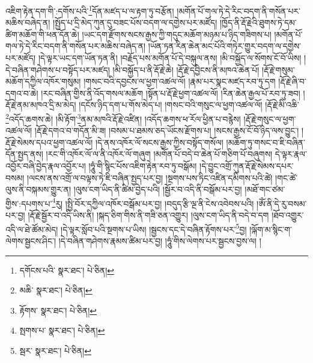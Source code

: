 འཇིག་རྟེན་དག་གི་:དགོས་པའི་\footnote{དགོངས་པའི་  སྣར་ཐང་།  པེ་ཅིན། }དོན་མཛད་པ་ལ་རྟག་ཏུ་བརྩོན། །མགོན་པོ་གལ་ཏེ་དེ་རིང་བདག་ནི་གསོན་པར་མཆིས་བཞེད་ན། །སྤྱོད་པ་དྲི་མེད་ཀུན་དུ་བཟང་པོས་བདག་ལ་དགྱེས་པར་མཛོད། །ཁྱོད་ནི་རྡོ་རྗེའི་ཐུགས་ཏེ་དམ་ཚིག་མཆོག་གི་ཕན་དོན་ཆེ། །ཡང་དག་རྫོགས་སངས་རྒྱས་ཀྱི་གདུང་མཆོག་མཉམ་པ་ཉིད་གཟིགས་པ། །མགོན་པོ་གལ་ཏེ་དེ་རིང་བདག་ནི་གསོན་པར་མཆིས་བཞེད་ན། །ཡོན་ཏན་རིན་ཆེན་མང་པོའི་གཏེར་གྱུར་བདག་ལ་དགྱེས་པར་མཛོད། །དེ་ལྟར་ཡང་དག་ཡོན་ཏན་ནི། །བརྗོད་པས་མགོན་པོ་དེ་བསྐུལ་ནས། །མི་བསྐྱོད་ལ་སོགས་ངོ་བོ་ཡིས། །དེ་བཞིན་གཤེགས་པ་བསྟོད་པར་མཛད། །མི་བསྐྱོད་པ་ནི་རྡོ་རྗེ་ཆེ། །རྡོ་རྗེ་དབྱིངས་ནི་མཁའ་ཆེན་པོ། །རྡོ་རྗེ་གསུམ་མཆོག་དཀྱིལ་འཁོར་གསུམ། །གསང་བའི་དབྱངས་ལ་ཕྱག་འཚལ་ལོ། །རྣམ་པར་སྣང་མཛད་རབ་ཏུ་དག །རྡོ་རྗེ་ཞི་བ་དགའ་བ་ཆེ། །རང་བཞིན་གྱིས་ནི་འོད་གསལ་མཆོག །སྟོན་པ་རྡོ་རྗེ་ཕྱག་འཚལ་ལོ། །རིན་ཆེན་རྒྱལ་པོ་རབ་ཏུ་ཟབ། །རྡོ་རྗེ་ནམ་མཁའ་དྲི་མ་མེད། །དངོས་ཉིད་དག་པ་གོས་མེད་པ། །གསང་བའི་གསུང་ལ་ཕྱག་འཚལ་ལོ། །རྡོ་རྗེ་མི་འཆི་\footnote{མཆི་  སྣར་ཐང་།  པེ་ཅིན། }འདོད་ཆགས་ཆེ། །མི་རྟོག་\footnote{རྟོགས་  སྣར་ཐང་།  པེ་ཅིན། }ནམ་མཁའི་རྡོ་རྗེ་འཛིན། །འདོད་ཆགས་ཕ་རོལ་ཕྱིན་པ་བརྙེས། །རྡོ་རྗེ་གསུང་ལ་ཕྱག་འཚལ་ལོ། །རྡོ་རྗེ་དགའ་བ་གདོན་མི་ཟ། །བསམ་པ་ཐམས་ཅད་ཡོངས་རྫོགས་པ། །སངས་རྒྱས་ངོ་བོ་ཉིད་ལས་བྱུང་། །རྡོ་རྗེ་སེམས་དཔའ་ཕྱག་འཚལ་ལོ། །དེ་ནས་འཁོར་ལོ་སངས་རྒྱས་ཀྱིས་བསྟོད་གསོལ། །མཆོག་ཏུ་གསང་བ་ཇི་བཞིན་དོན་སྤྱད་ནས། །རང་གི་འཁོར་ལོ་ལ་ནི་འཁོར་ལོ་གཞུག །མགོན་པོ་བདེ་བ་ཆེན་པོ་གཅིག་པོ་བཞུགས། དེ་ལྟར་རྣལ་འབྱོར་བཞི་བྱེད་རྣལ་འབྱོར་པ། །ཧཱུཾ་གི་སྙིང་པོས་འཇིག་རྟེན་རབ་ཏུ་བསྒོམ། །དེ་བྱུང་འགྲོ་ཀུན་རྡོ་རྗེ་སེམས་དཔར་བསམ། །ལངས་ནས་འགྲོ་ལ་བལྟས་ཏེ་ཇི་བཞིན་སྤྱད་པར་བྱ། །སྔགས་པས་ཏིང་འཛིན་དམིགས་པའི་ཚེ། །གང་ཚེ་ལུས་ནི་བསྐམས་གྱུར་ན། །ལུས་ངག་ཡིད་ནི་ཚིམ་བྱེད་པའི། །སྦྱོར་བ་འདི་ནི་བསྒོམ་པར་བྱ། །མཐོ་གང་ཙམ་གྱིས་:དཔགས་པ་\footnote{སྤགས་པ་  སྣར་ཐང་།  པེ་ཅིན། }རུ། །སྤྱི་བོར་དཀྱིལ་འཁོར་བསྒོམ་པར་བྱ། །བདུད་རྩི་ལྔ་ནི་ངེས་འབེབས་པའི། །ཨོཾ་ནི་དེ་རུ་བསམ་པར་བྱ། །རྡོ་རྗེ་སྦྱོར་བ་འདི་ཡིས་ནི། །སྐད་ཅིག་གིས་ནི་གཟི་ཅན་འགྱུར། །ལུས་ངག་ཡིད་ནི་བདེ་བ་དག །ཐོབ་འགྱུར་འདི་ལ་ཐེ་ཚོམ་མེད། །དེ་ལྟར་སློབ་པའི་སྔགས་པ་ཡིས། །སྦྱངས་དང་དེ་བཞིན་རྟོགས་པར་\footnote{སྦར་  སྣར་ཐང་།  པེ་ཅིན། }བྱ། །ལྐོག་མ་སྙིང་ག་ལེགས་སྦྱངས་ཤིང་། །དེ་བཞིན་གཤེགས་རྣམས་ཚིམ་པར་བྱ། །ཧཱུཾ་གིས་ལེགས་པར་སྦྱངས་བྱས་ལ། །
